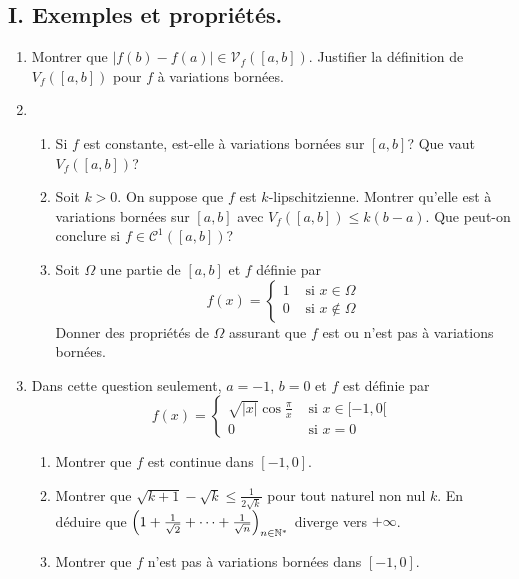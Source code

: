 \subsection*{I. Exemples et propriétés.}
\begin{enumerate}
  \item Montrer que $\left|f(b)-f(a)\right| \in \mathcal{V}_f([a,b])$. Justifier la définition de $V_f([a,b])$ pour $f$ à variations bornées.

  \item
\begin{enumerate}
  \item Si $f$ est constante, est-elle à variations bornées sur $[a,b]$? Que vaut $V_f([a,b])$?
  \item Soit $k>0$. On suppose que $f$ est $k$-lipschitzienne. Montrer qu'elle est à variations bornées sur $[a,b]$ avec $V_f([a,b])\leq k(b-a)$. Que peut-on conclure si $f\in \mathcal{C}^1([a,b])$?
  \item Soit $\Omega$ une partie de $[a,b]$ et $f$ définie par
\begin{displaymath}
f(x)=
\left\lbrace 
\begin{aligned}
  1 &\text{ si } x \in \Omega \\
  0 &\text{ si } x \notin \Omega
\end{aligned}
\right. 
\end{displaymath}
Donner des propriétés de $\Omega$ assurant que $f$ est ou n'est pas à variations bornées.
\end{enumerate}
  
  \item Dans cette question seulement, $a=-1$, $b=0$ et $f$ est définie par
\begin{displaymath}
f(x)=
\left\lbrace 
\begin{aligned}
  \sqrt{|x|}\cos\frac{\pi}{x} &\text{ si } x \in [-1,0[ \\
  0 &\text{ si } x = 0
\end{aligned}
\right. 
\end{displaymath}
\begin{enumerate}
  \item Montrer que $f$ est continue dans $[-1,0]$.
  \item Montrer que $\sqrt{k+1} - \sqrt{k} \leq \frac{1}{2\sqrt{k}}$ pour tout naturel non nul $k$. En déduire que $\left(1+\frac{1}{\sqrt{2}} + \cdots + \frac{1}{\sqrt{n}}\right)_{n\in \mathbb{N}^*}$ diverge vers $+\infty$.

\item Montrer que $f$ n'est pas à variations bornées dans $[-1,0]$.
\end{enumerate}


\end{enumerate}
